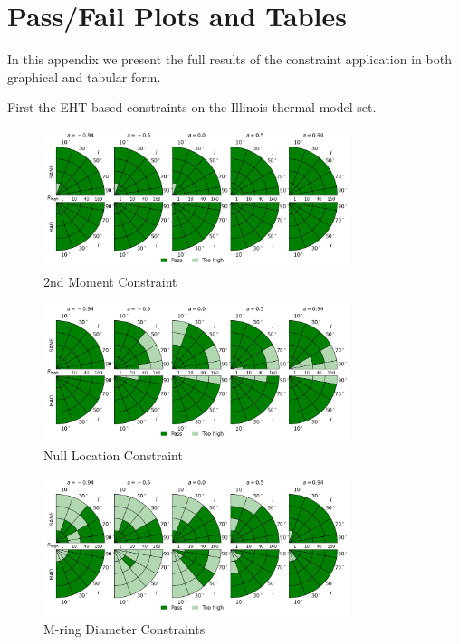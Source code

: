 \section{Pass/Fail Plots and Tables}\label{app:tables}


In this appendix we present the full results of the constraint application in both graphical and tabular form.

First the EHT-based constraints on the Illinois thermal model set.

\begin{figure}
  \centering
  \includegraphics[width=0.8\textwidth]{./figures/230GHz_size_Constraints.png}
  \caption{2nd Moment Constraint}
  \label{fig:230GHz_size_pizza}
\end{figure}
\begin{figure}
  \centering
  \includegraphics[width=0.8\textwidth]{./figures/Null_loc_Constraints.png}
  \caption{Null Location Constraint}
  \label{fig:null_pizza}
\end{figure}
\begin{figure}
  \centering
  \includegraphics[width=0.8\textwidth]{./figures/Mring_d_Constraints.png}
  \caption{M-ring Diameter Constraints}
  \label{fig:mring_diam_pizza}
\end{figure}

